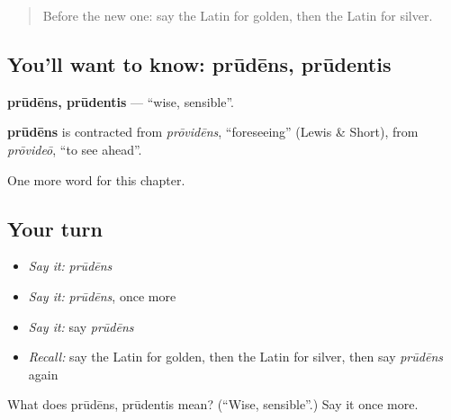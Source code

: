 \label{lesson:LA-C149-prudens}



\begin{quote}
Before the new one: say the Latin for golden, then the Latin for silver.
\end{quote}

\subsection*{You'll want to know: prūdēns, prūdentis}
\textbf{prūdēns, prūdentis} — \textquotedblleft{}wise, sensible\textquotedblright{}.

\begin{cousinweb}
\textbf{prūdēns} is contracted from \emph{prōvidēns}, \textquotedblleft{}foreseeing\textquotedblright{} (Lewis \& Short), from \emph{prōvideō}, \textquotedblleft{}to see ahead\textquotedblright{}.
\end{cousinweb}

\begin{grammarlens}[title={What you've built}]
One more word for this chapter.
\end{grammarlens}

\subsection*{Your turn}
\begin{itemize}
\raggedright
  \item \emph{Say it:} \emph{prūdēns}
  \item \emph{Say it:} \emph{prūdēns}, once more
  \item \emph{Say it:} say \emph{prūdēns}
  \item \emph{Recall:} say the Latin for golden, then the Latin for silver, then say \emph{prūdēns} again
\end{itemize}

\begin{tcolorbox}[breakable,colback=teal!4,colframe=teal!35!black,title={Before you move on}]
What does prūdēns, prūdentis mean? (\textquotedblleft{}Wise, sensible\textquotedblright{}.) Say it once more.
\end{tcolorbox}
